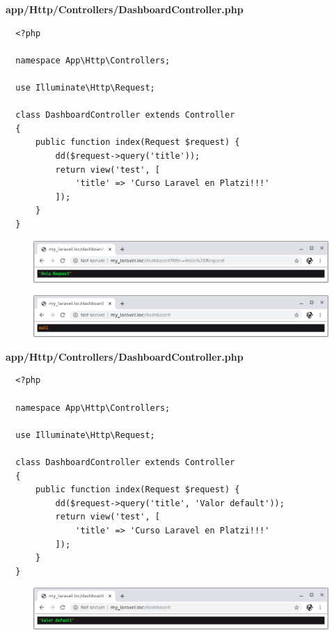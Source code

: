 \documentclass{article}
\begin{document}
\textbf{app/Http/Controllers/DashboardController.php}
\begin{verbatim}
  <?php

  namespace App\Http\Controllers;

  use Illuminate\Http\Request;

  class DashboardController extends Controller
  {
      public function index(Request $request) {
          dd($request->query('title'));
          return view('test', [
              'title' => 'Curso Laravel en Platzi!!!'
          ]);
      }
  }
\end{verbatim}

\begin{figure}[h!]
  \centering
  \includegraphics[scale=0.5]{./Pictures/017_dd_title.png}
\end{figure}

\begin{figure}[h!]
  \centering
  \includegraphics[scale=0.5]{./Pictures/018_dd_title_null.png}
\end{figure}

\textbf{app/Http/Controllers/DashboardController.php}
\begin{verbatim}
  <?php

  namespace App\Http\Controllers;

  use Illuminate\Http\Request;

  class DashboardController extends Controller
  {
      public function index(Request $request) {
          dd($request->query('title', 'Valor default'));
          return view('test', [
              'title' => 'Curso Laravel en Platzi!!!'
          ]);
      }
  }
\end{verbatim}

\begin{figure}[h!]
  \centering
  \includegraphics[scale=0.5]{./Pictures/019_dd_title_default.png}
\end{figure}
\end{document}
